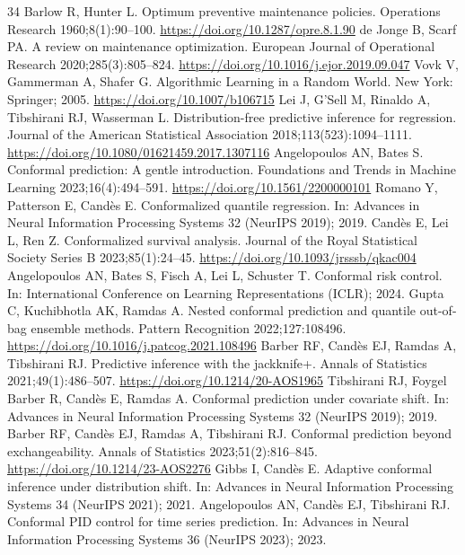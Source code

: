 \begin{thebibliography}{34}
 Barlow R, Hunter L. Optimum preventive maintenance policies. Operations Research 1960;8(1):90--100. \url{https://doi.org/10.1287/opre.8.1.90}
 de Jonge B, Scarf PA. A review on maintenance optimization. European Journal of Operational Research 2020;285(3):805--824. \url{https://doi.org/10.1016/j.ejor.2019.09.047}
 Vovk V, Gammerman A, Shafer G. Algorithmic Learning in a Random World. New York: Springer; 2005. \url{https://doi.org/10.1007/b106715}
 Lei J, G'Sell M, Rinaldo A, Tibshirani RJ, Wasserman L. Distribution-free predictive inference for regression. Journal of the American Statistical Association 2018;113(523):1094--1111. \url{https://doi.org/10.1080/01621459.2017.1307116}
 Angelopoulos AN, Bates S. Conformal prediction: A gentle introduction. Foundations and Trends in Machine Learning 2023;16(4):494--591. \url{https://doi.org/10.1561/2200000101}
 Romano Y, Patterson E, Cand\`es E. Conformalized quantile regression. In: Advances in Neural Information Processing Systems 32 (NeurIPS 2019); 2019.
 Cand\`es E, Lei L, Ren Z. Conformalized survival analysis. Journal of the Royal Statistical Society Series B 2023;85(1):24--45. \url{https://doi.org/10.1093/jrsssb/qkac004}
 Angelopoulos AN, Bates S, Fisch A, Lei L, Schuster T. Conformal risk control. In: International Conference on Learning Representations (ICLR); 2024.
 Gupta C, Kuchibhotla AK, Ramdas A. Nested conformal prediction and quantile out-of-bag ensemble methods. Pattern Recognition 2022;127:108496. \url{https://doi.org/10.1016/j.patcog.2021.108496}
 Barber RF, Cand\`es EJ, Ramdas A, Tibshirani RJ. Predictive inference with the jackknife+. Annals of Statistics 2021;49(1):486--507. \url{https://doi.org/10.1214/20-AOS1965}
 Tibshirani RJ, Foygel Barber R, Cand\`es E, Ramdas A. Conformal prediction under covariate shift. In: Advances in Neural Information Processing Systems 32 (NeurIPS 2019); 2019.
 Barber RF, Cand\`es EJ, Ramdas A, Tibshirani RJ. Conformal prediction beyond exchangeability. Annals of Statistics 2023;51(2):816--845. \url{https://doi.org/10.1214/23-AOS2276}
 Gibbs I, Cand\`es E. Adaptive conformal inference under distribution shift. In: Advances in Neural Information Processing Systems 34 (NeurIPS 2021); 2021.
 Angelopoulos AN, Cand\`es EJ, Tibshirani RJ. Conformal PID control for time series prediction. In: Advances in Neural Information Processing Systems 36 (NeurIPS 2023); 2023.

\end{thebibliography}
